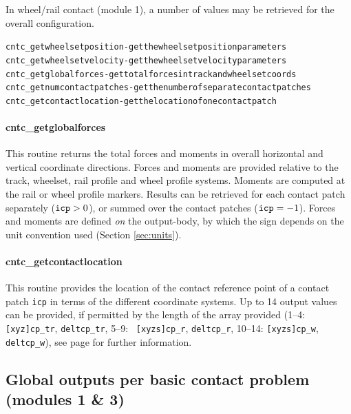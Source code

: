\documentclass[12pt]{report}
\begin{document}
In wheel/rail contact (module 1), a number of values may be retrieved for
the overall configuration.
\begin{alltt}\small
cntc_getwheelsetposition    - get the wheelset position parameters
cntc_getwheelsetvelocity    - get the wheelset velocity parameters
cntc_getglobalforces        - get total forces in track and wheelset coords
cntc_getnumcontactpatches   - get the number of separate contact patches
cntc_getcontactlocation     - get the location of one contact patch
\end{alltt}

\paragraph{cntc\_getglobalforces}

This routine returns the total forces and moments in overall horizontal and
vertical coordinate directions. Forces and moments are provided relative to
the track, wheelset, rail profile and wheel profile systems.  Moments are
computed at the rail or wheel profile markers.  Results can be retrieved
for each contact patch separately (${\tt icp}>0$), or summed over the
contact patches (${\tt icp}=-1$).  Forces and moments are defined {\em
on\/} the output-body, by which the sign depends on the unit convention
used (Section \ref{sec:units}).

\paragraph{cntc\_getcontactlocation}

This routine provides the location of the contact reference point of a
contact patch {\tt icp} in terms of the different coordinate systems. Up to
14 output values can be provided, if permitted by the length of the array
provided (1--4: {\tt [xyz]cp\_tr}, {\tt deltcp\_tr}, 5--9: {\tt
[xyzs]cp\_r}, {\tt deltcp\_r}, 10--14: {\tt [xyzs]cp\_w}, {\tt deltcp\_w}),
see page \pageref{pg:contact_refpos} for further information.

\subsection{Global outputs per basic contact problem (modules 1 \& 3)}
\label{sec:global_output3}
\end{document}
